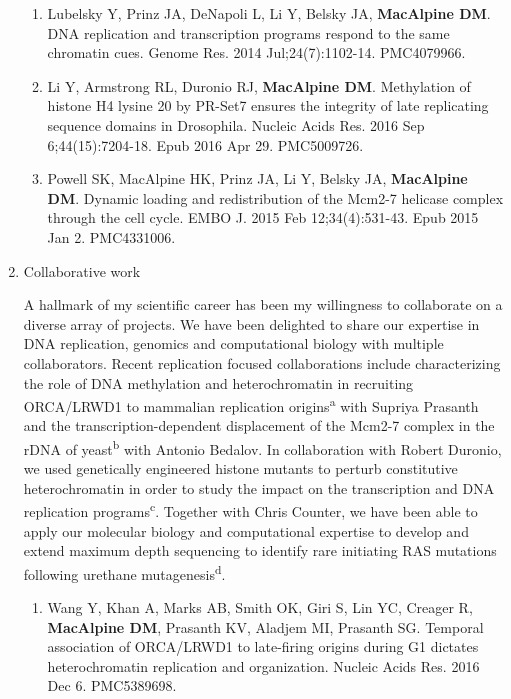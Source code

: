 \documentclass{nihbiosketch}
\begin{document}
\begin{enumerate}
\begin{enumerate}
\item Lubelsky Y, Prinz JA, DeNapoli L, Li Y, Belsky JA, \textbf{MacAlpine DM}. DNA
replication and transcription programs respond to the same chromatin cues. Genome Res. 2014 Jul;24(7):1102-14. PMC4079966.

\item Li Y, Armstrong RL, Duronio RJ, \textbf{MacAlpine DM}. Methylation of histone H4 lysine 20 by PR-Set7 ensures the integrity of late replicating sequence domains in Drosophila. Nucleic Acids Res. 2016 Sep 6;44(15):7204-18.  Epub 2016 Apr 29. PMC5009726.

\item Powell SK, MacAlpine HK, Prinz JA, Li Y, Belsky JA, \textbf{MacAlpine DM}. Dynamic
loading and redistribution of the Mcm2-7 helicase complex through the cell cycle. EMBO J. 2015 Feb 12;34(4):531-43. Epub 2015 Jan 2. PMC4331006.


\end{enumerate}

\item Collaborative work

\noindent A hallmark of my scientific career has been my willingness to collaborate on a diverse array of projects.  We have been delighted to share our expertise in DNA replication, genomics and computational biology with multiple collaborators.  Recent replication focused collaborations include characterizing the role of DNA methylation and heterochromatin in recruiting ORCA/LRWD1 to mammalian replication origins\textsuperscript{a} with Supriya Prasanth and the transcription-dependent displacement of the Mcm2-7 complex in the rDNA of yeast\textsuperscript{b} with Antonio Bedalov.  In collaboration with Robert Duronio, we used genetically engineered histone mutants to perturb constitutive heterochromatin in order to study the impact on the transcription and DNA replication programs\textsuperscript{c}.  Together with Chris Counter, we have been able to apply our molecular biology and computational expertise to develop and extend maximum depth sequencing to identify rare initiating RAS mutations following urethane mutagenesis\textsuperscript{d}.  



\begin{enumerate}
\setlength\itemsep{0.35em}


\item Wang Y, Khan A, Marks AB, Smith OK, Giri S, Lin YC, Creager R, \textbf{MacAlpine DM},
Prasanth KV, Aladjem MI, Prasanth SG. Temporal association of ORCA/LRWD1 to
late-firing origins during G1 dictates heterochromatin replication and
organization. Nucleic Acids Res. 2016 Dec 6. PMC5389698.



\end{enumerate}
\end{enumerate}
\end{document}
